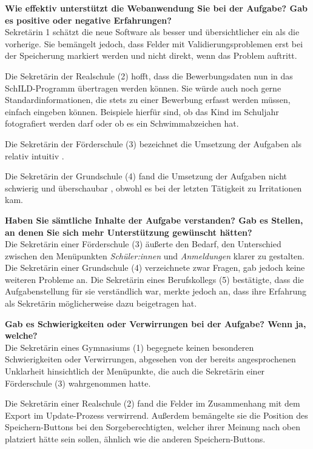 \textbf{Wie effektiv unterstützt die Webanwendung Sie bei der Aufgabe?  Gab es positive oder negative Erfahrungen?}\\
Sekretärin 1 schätzt die neue Software als besser und übersichtlicher ein als die vorherige. Sie bemängelt jedoch, dass Felder mit Validierungsproblemen erst bei der Speicherung markiert werden und nicht direkt, wenn das Problem auftritt.

Die Sekretärin der Realschule (2) hofft, dass die Bewerbungsdaten nun in das SchILD-Programm übertragen werden können. Sie würde auch noch gerne \glqq Standardinformationen\grqq{}, die stets zu einer Bewerbung erfasst werden müssen, einfach eingeben können. Beispiele hierfür sind, ob das Kind im Schuljahr fotografiert werden darf oder ob es ein Schwimmabzeichen hat. 

Die Sekretärin der Förderschule (3) bezeichnet die Umsetzung der Aufgaben als \glqq relativ intuitiv\grqq{} .

Die Sekretärin der Grundschule (4) fand die Umsetzung der Aufgaben \glqq nicht schwierig\grqq{}  und \glqq überschaubar\grqq{} , obwohl es bei der letzten Tätigkeit zu Irritationen kam.

\textbf{Haben Sie sämtliche Inhalte der Aufgabe verstanden? Gab es Stellen, an denen Sie sich mehr Unterstützung gewünscht hätten?}\\
Die Sekretärin einer Förderschule (3) äußerte den Bedarf, den Unterschied zwischen den Menüpunkten \textit{Schüler:innen} und \textit{Anmeldungen} klarer zu gestalten. Die Sekretärin einer Grundschule (4) verzeichnete zwar Fragen, gab jedoch keine weiteren Probleme an. Die Sekretärin eines Berufskollegs (5) bestätigte, dass die Aufgabenstellung für sie verständlich war, merkte jedoch an, dass ihre Erfahrung als Sekretärin möglicherweise dazu beigetragen hat.

\textbf{Gab es Schwierigkeiten oder Verwirrungen bei der Aufgabe? Wenn ja, welche?}\\
Die Sekretärin eines Gymnasiums (1) begegnete keinen besonderen Schwierigkeiten oder Verwirrungen, abgesehen von der bereits angesprochenen Unklarheit hinsichtlich der Menüpunkte, die auch die Sekretärin einer Förderschule (3) wahrgenommen hatte.

Die Sekretärin einer Realschule (2) fand die Felder im Zusammenhang mit dem Export im Update-Prozess verwirrend. Außerdem bemängelte sie die Position des Speichern-Buttons bei den Sorgeberechtigten, welcher ihrer Meinung nach oben platziert hätte sein sollen, ähnlich wie die anderen Speichern-Buttons.

